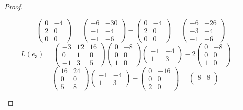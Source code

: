 \documentclass[11pt, fleqn]{article}
\begin{document}
\begin{proof}
\begin{enumerate}
\[\begin{pmatrix}
      0 & -4\\
      2 & 0\\
      0 & 0
    \end{pmatrix} = \begin{pmatrix}
      -6 & -30\\
      -1 & -4\\
      -1 & -6
    \end{pmatrix} - \begin{pmatrix}
      0 & -4\\
      2 & 0\\
      0 & 0
    \end{pmatrix} = \begin{pmatrix}
      -6 & -26\\
      -3 & -4\\
      -1 & -6
    \end{pmatrix}\]
    \[L(e_3) = \begin{pmatrix}
      -3 & 12 & 16\\
      0 & 1 & 0\\
      -1 & 3 & 5
    \end{pmatrix} \begin{pmatrix}
      0 & -8\\
      0 & 0\\
      1 & 0
    \end{pmatrix} \begin{pmatrix}
      -1 & -4\\
      1 & 3
    \end{pmatrix} - 2 \begin{pmatrix}
      0 & -8\\
      0 & 0\\
      1 & 0
    \end{pmatrix} =\]
    \[= \begin{pmatrix}
      16 & 24\\
      0 & 0\\
      5 & 8
    \end{pmatrix} \begin{pmatrix}
      -1 & -4\\
      1 & 3
    \end{pmatrix} - \begin{pmatrix}
      0 & -16\\
      0 & 0\\
      2 & 0
    \end{pmatrix} = \begin{pmatrix}
      8 & 8\\

\end{pmatrix}\]
\end{enumerate}
\end{proof}
\end{document}
